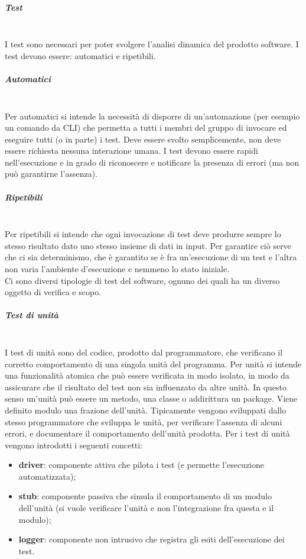 \subparagraph{Test} \mbox{}\\
I test sono necessari per poter svolgere l'analisi dinamica del prodotto software.
I test devono essere: automatici e ripetibili.
\subparagraph*{Automatici} \mbox{}\\ 
Per automatici si intende la necessità di disporre di un'automazione (per esempio un comando da CLI) che permetta a tutti i membri del gruppo di invocare ed eseguire tutti (o in parte) i test.
Deve essere svolto semplicemente, non deve essere richiesta nessuna interazione umana.
I test devono essere rapidi nell’esecuzione e in grado di riconoscere e notificare la presenza di errori (ma non può garantirne l'assenza).
\subparagraph*{Ripetibili} \mbox{}\\
Per ripetibili si intende che ogni invocazione di test deve produrre sempre lo stesso risultato dato uno stesso insieme di dati in input. Per garantire ciò serve che ci sia determinismo, che è garantito se è fra un'esecuzione di un test e l'altra non varia l'ambiente d'esecuzione e nemmeno lo stato iniziale.\\

Ci sono diversi tipologie di test del software, ognuno dei quali ha un diverso oggetto di verifica e scopo.

\subparagraph{Test di unità} \mbox{}\\
I test di unità sono del codice, prodotto dal programmatore, che verificano il corretto comportamento di una singola unità del programma.
Per unità si intende una funzionalità atomica che può essere verificata in modo isolato, in modo da assicurare che il risultato del test non sia influenzato da altre unità. In questo senso un'unità può essere un metodo, una classe o addirittura un package.
Viene definito modulo una frazione dell'unità.
Tipicamente vengono sviluppati dallo stesso programmatore che sviluppa le unità, per verificare l’assenza di alcuni errori, e documentare il comportamento dell’unità prodotta.
Per i test di unità vengono introdotti i seguenti concetti:
\begin{itemize}
    \item \textbf{driver}: componente attiva che pilota i test (e permette l'esecuzione automatizzata);
    \item \textbf{stub}: componente passiva che simula il comportamento di un modulo dell'unità (si vuole verificare l'unità e non l'integrazione fra questa e il modulo);
    \item \textbf{logger}: componente non intrusivo che registra gli esiti dell'esecuzione dei test.
\end{itemize}

